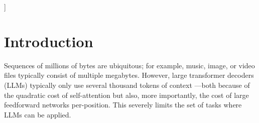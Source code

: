 \documentclass{article}
\newcommand{\fastslow}[0]{\textsc{MegaByte}\xspace}
\theoremstyle{plain}
\theoremstyle{definition}
\theoremstyle{remark}
\begin{document}
\vskip 0.3in
]



\printAffiliationsAndNotice{\icmlEqualContribution} %

\begin{abstract}
Autoregressive transformers are spectacular models for short sequences but scale poorly to long sequences such as high-resolution images, podcasts, code, or books. We propose \fastslow, a multi-scale decoder architecture that enables end-to-end differentiable modeling of sequences of over one million bytes.
\fastslow segments sequences into patches and uses a \emph{local} submodel within patches and a \emph{global} model between patches. This enables sub-quadratic self-attention, much larger feedforward layers for the same compute, and improved parallelism during decoding---unlocking  better performance at reduced cost for both training and generation. 
Extensive experiments show that \fastslow allows byte-level models to perform competitively with subword models on long context language modeling, achieve state-of-the-art density estimation on ImageNet, and model audio from raw files. Together, these results establish the  viability of tokenization-free autoregressive sequence modeling at scale. 
\end{abstract}

\section{Introduction}
\label{sec:intro}
Sequences of millions of bytes are ubiquitous; for example, music, image, or video files typically consist of multiple megabytes. 
However, large transformer decoders (LLMs) typically only use several thousand tokens of context \citep{gpt3,Zhang2022OPT:Models}---both because of the quadratic cost of self-attention but also, more importantly, the cost of large feedforward networks per-position. 
This severely limits the set of tasks where LLMs can be applied.
\end{document}
